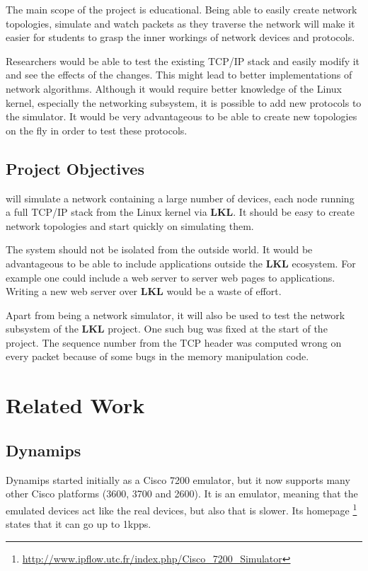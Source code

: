 The main scope of the project is educational. Being able to easily create network topologies, 
simulate and watch packets as they traverse the network will make it easier for students
to grasp the inner workings of network devices and protocols.

Researchers would be able to test the existing TCP/IP stack and easily modify it and see
the effects of the changes. This might lead to better implementations of network
algorithms. Although it would require better knowledge of the Linux kernel, especially
the networking subsystem, it is possible to add new protocols to the simulator. It would
be very advantageous to be able to create new topologies on the fly in order to test these protocols.

\subsection{Project Objectives}
\label{sub-sec:proj-objectives}

\textbf{\project} will simulate a network containing a large number of devices, each node
running a full TCP/IP stack from the Linux kernel via \textbf{LKL}. It should be easy to create 
network topologies and start quickly on simulating them. 

The system should not be isolated from the outside world. It would be advantageous to be able
to include applications outside the \textbf{LKL} ecosystem. For example one could include
a web server to server web pages to applications. Writing a new web server over \textbf{LKL} would
be a waste of effort.

Apart from being a network simulator, it will also be used to test the network subsystem of the \textbf{LKL}
project. One such bug was fixed at the start of the project. The sequence number from the TCP header
was computed wrong on every packet because of some bugs in the memory manipulation code.

\section{Related Work}
\label{sec:proj-related}

\subsection{Dynamips}

Dynamips started initially as a Cisco 7200 emulator, but it now supports many other
Cisco platforms (3600, 3700 and 2600). It is an emulator, meaning that the emulated
devices act like the real devices, but also that is slower. Its
homepage \footnote{\url{http://www.ipflow.utc.fr/index.php/Cisco_7200_Simulator}}
states that it can go up to 1kpps. 

